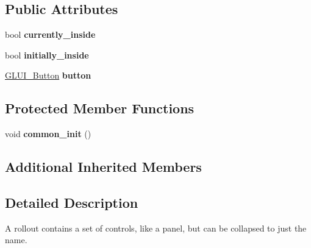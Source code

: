 \subsection*{Public Attributes}
\begin{DoxyCompactItemize}
\item 
\hypertarget{classGLUI__Rollout_aa9896aa7e1ee76ac8b4d84573da7e6fb}{bool {\bfseries currently\-\_\-inside}}\label{classGLUI__Rollout_aa9896aa7e1ee76ac8b4d84573da7e6fb}

\item 
\hypertarget{classGLUI__Rollout_ad9d35f15e7df49dc27fdc5ab571e0e17}{bool {\bfseries initially\-\_\-inside}}\label{classGLUI__Rollout_ad9d35f15e7df49dc27fdc5ab571e0e17}

\item 
\hypertarget{classGLUI__Rollout_a552827a8d2ff58920457b8637b9536b0}{\hyperlink{classGLUI__Button}{G\-L\-U\-I\-\_\-\-Button} {\bfseries button}}\label{classGLUI__Rollout_a552827a8d2ff58920457b8637b9536b0}

\end{DoxyCompactItemize}
\subsection*{Protected Member Functions}
\begin{DoxyCompactItemize}
\item 
\hypertarget{classGLUI__Rollout_aaf1aa792f0fd5a90822e13ecd2797736}{void {\bfseries common\-\_\-init} ()}\label{classGLUI__Rollout_aaf1aa792f0fd5a90822e13ecd2797736}

\end{DoxyCompactItemize}
\subsection*{Additional Inherited Members}


\subsection{Detailed Description}
A rollout contains a set of controls, like a panel, but can be collapsed to just the name. 

